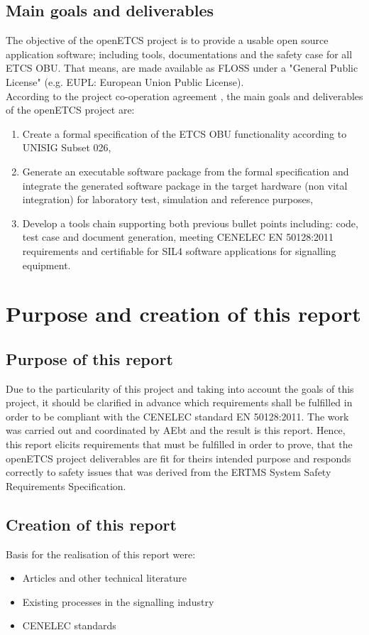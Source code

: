 \documentclass{template/openetcs_report}
\begin{document}
\section{Main goals and deliverables}
The objective of the openETCS project is to provide a usable open source application software; including tools, documentations and the safety case for all ETCS OBU. That means, are made available as FLOSS under a "General Public License" (e.g. EUPL: European Union Public License).
\\
According to the project co-operation agreement \cite{PCA12}, the main goals and deliverables of the openETCS project are:
\begin{enumerate}
  \item Create a formal specification of the ETCS OBU functionality according to UNISIG Subset 026,
  \item Generate an executable software package from the formal specification and integrate the generated software package in the target hardware (non vital integration) for laboratory test, simulation and reference purposes,  
  \item Develop a tools chain supporting both previous bullet points including: code, test case and document generation, meeting CENELEC EN 50128:2011 requirements and certifiable for SIL4 software applications for signalling equipment.
\end{enumerate}


\chapter{Purpose and creation of this report}

\section{Purpose of this report}
Due to the particularity of this project and taking into account the goals of this project, it should be clarified in advance which requirements shall be fulfilled in order to be compliant with the CENELEC standard EN 50128:2011. The work was carried out and coordinated by AEbt and the result is this report. Hence, this report elicits requirements that must be fulfilled in order to prove, that the openETCS project deliverables are fit for theirs intended purpose and responds correctly to safety issues that was derived from the ERTMS System Safety Requirements Specification.

\section{Creation of this report}
\label{report}
Basis for the realisation of this report were:
\begin{itemize}
  \item Articles and other technical literature
  \item Existing processes in the signalling industry
  \item CENELEC standards
\end{itemize}
\end{document}
